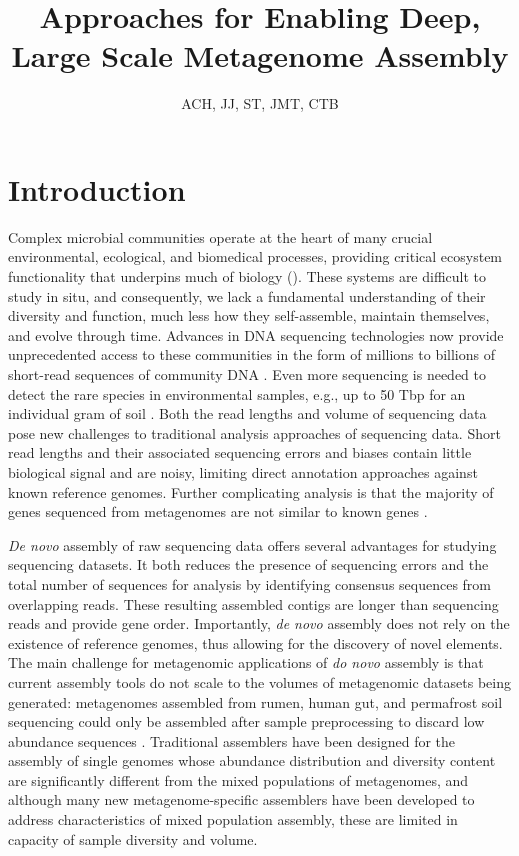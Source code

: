 \documentclass[11pt]{article} %
\begin{document}
\title{Approaches for Enabling Deep, Large Scale Metagenome Assembly}
\author{ACH, JJ, ST, JMT, CTB}
\maketitle

\section{Introduction}  
Complex microbial communities operate at the heart of many crucial environmental, ecological, and biomedical processes, providing critical ecosystem functionality that underpins much of biology (\cite{Arumugam:2011p735,Hess:2011p686,Iverson:2012p1281,Mackelprang:2011p1087,Qin:2010p189,Tringe:2005p174,Venter:2004p170}).  These systems are difficult to study in situ, and consequently, we lack a fundamental understanding of their diversity and function, much less how they self-assemble, maintain themselves, and evolve through time.  Advances in DNA sequencing technologies now provide unprecedented access to these communities in the form of millions to billions of short-read sequences of community DNA  \cite{Hess:2011p686,Mackelprang:2011p1087,Qin:2010p189}.   Even more sequencing is needed to detect the rare species in environmental samples, e.g., up to 50 Tbp for an individual gram of soil \cite{Gans:2005p1365}.   Both the read lengths and volume of sequencing data pose new challenges to traditional analysis approaches of sequencing data.  Short read lengths and their associated sequencing errors and biases contain little biological signal and are noisy, limiting direct annotation approaches against known reference genomes.  Further complicating analysis is that the majority of genes sequenced from metagenomes are not similar to known genes \cite{Arumugam:2011p735,Qin:2010p189}.  

\emph{De novo} assembly of raw sequencing data offers several advantages for studying  sequencing datasets.  It both reduces the presence  of sequencing errors and the total number of sequences for analysis by identifying consensus sequences from overlapping reads.  These resulting assembled contigs are longer than sequencing reads and provide gene order.  Importantly, \emph{de novo} assembly does not rely on the existence of reference genomes, thus allowing for the discovery of novel elements.   The main challenge for metagenomic applications of \emph{do novo} assembly is that current assembly tools do not scale to the volumes of metagenomic datasets being generated: metagenomes assembled from rumen, human gut, and permafrost soil sequencing could only be assembled after sample preprocessing to discard low abundance sequences \cite{Hess:2011p686,Mackelprang:2011p1087,Qin:2010p189}.  Traditional assemblers have been designed for the assembly of single genomes whose abundance distribution and diversity content are significantly different from the mixed populations of metagenomes, and although many new metagenome-specific assemblers have been developed to address characteristics of mixed population assembly, these are limited in capacity of sample diversity and volume.    
\end{document}
